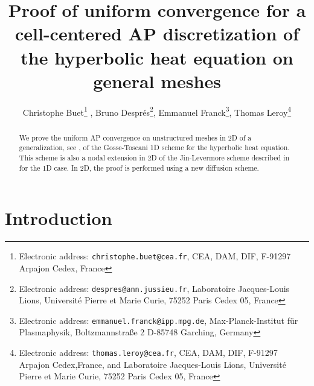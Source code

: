 \documentclass[a4paper,french,english,10pt]{article}
\begin{document}
\title{Proof of uniform convergence for a cell-centered  AP discretization  of the hyperbolic heat equation 
 on general meshes}


\author{Christophe Buet\thanks{Electronic address: 
\texttt{christophe.buet@cea.fr},
CEA, DAM, DIF,  F-91297 Arpajon Cedex, France}
,
Bruno Despr\'es\thanks{Electronic address: 
\texttt{despres@ann.jussieu.fr}, Laboratoire Jacques-Louis Lions,
  Universit\'e Pierre et Marie Curie,
  75252 Paris Cedex 05,
  France},
Emmanuel Franck\thanks{Electronic address: \texttt{emmanuel.franck@ipp.mpg.de}, Max-Planck-Institut f\"ur Plasmaphysik, Boltzmannstra\ss e 2
D-85748 Garching, Germany},
Thomas Leroy\thanks{Electronic address: \texttt{thomas.leroy@cea.fr},
CEA, DAM, DIF, F-91297 Arpajon Cedex,France,
and Laboratoire Jacques-Louis Lions,
  Universit\'e Pierre et Marie Curie,
  75252 Paris Cedex 05,
  France}
}





\maketitle

\begin{abstract} 
We prove the uniform  AP convergence on unstructured
meshes in 2D of a  generalization, see \cite{glaceap},      of the Gosse-Toscani 
 1D scheme  for the hyperbolic heat equation. 
This   scheme 
 is also a nodal  extension in 2D  of the Jin-Levermore scheme described in \cite{jinlev} for the  1D case.
In 2D, the proof  is performed using a new diffusion scheme.
\end{abstract}


\section{Introduction}
%
%
%
%
%
\end{document}

